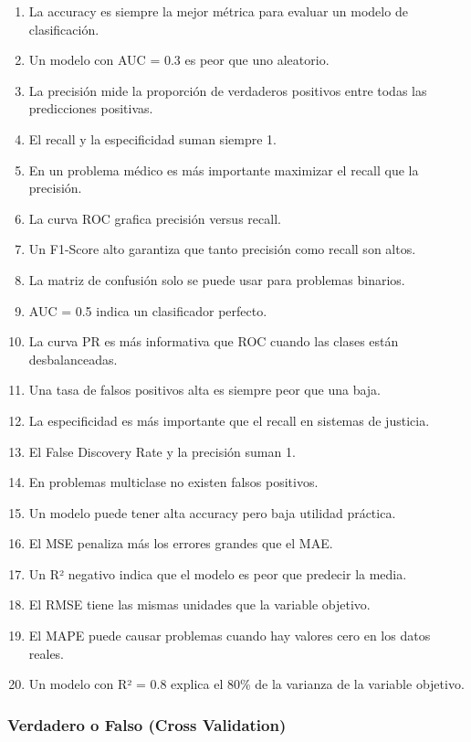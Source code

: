 \documentclass[12pt]{article}
\begin{document}
\begin{enumerate}
    \item La accuracy es siempre la mejor métrica para evaluar un modelo de clasificación.
    \item Un modelo con AUC = 0.3 es peor que uno aleatorio.
    \item La precisión mide la proporción de verdaderos positivos entre todas las predicciones positivas.
    \item El recall y la especificidad suman siempre 1.
    \item En un problema médico es más importante maximizar el recall que la precisión.
    \item La curva ROC grafica precisión versus recall.
    \item Un F1-Score alto garantiza que tanto precisión como recall son altos.
    \item La matriz de confusión solo se puede usar para problemas binarios.
    \item AUC = 0.5 indica un clasificador perfecto.
    \item La curva PR es más informativa que ROC cuando las clases están desbalanceadas.
    \item Una tasa de falsos positivos alta es siempre peor que una baja.
    \item La especificidad es más importante que el recall en sistemas de justicia.
    \item El False Discovery Rate y la precisión suman 1.
    \item En problemas multiclase no existen falsos positivos.
    \item Un modelo puede tener alta accuracy pero baja utilidad práctica.
    \item El MSE penaliza más los errores grandes que el MAE.
    \item Un R² negativo indica que el modelo es peor que predecir la media.
    \item El RMSE tiene las mismas unidades que la variable objetivo.
    \item El MAPE puede causar problemas cuando hay valores cero en los datos reales.
    \item Un modelo con R² = 0.8 explica el 80\% de la varianza de la variable objetivo.
\end{enumerate}

\subsubsection{Verdadero o Falso (Cross Validation)}
\end{document}
